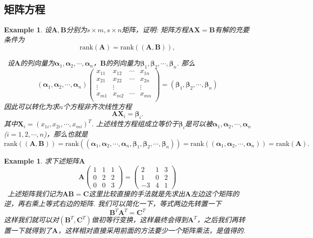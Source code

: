 \documentclass{article}
\newtheorem{example}[theorem]{Example}
\newcommand{\hints}{{\color{blue} \text{hints}}}
\newcommand{\mbf}[1]{\bm{#1}}
\newcommand{\rank}[1]{\text{rank}\left(#1\right)} %
\begin{document}
\subsection{矩阵方程}

\begin{example}
\rm 设$\mbf{A},\mbf{B}$分别为$s \times m,s \times n$矩阵，证明: 矩阵方程$\mbf{A}\mbf{X} = \mbf{B}$有解的充要条件为
$$
\rank{\mbf{A}} = \rank{(\mbf{A},\mbf{B})},
$$

\hints\ 设$\mbf{A}$的列向量为$\mbf{\alpha}_1,\mbf{\alpha}_2,\cdots,\mbf{\alpha}_n$，$\mbf{B}$的列向量为$\mbf{\beta}_1,\mbf{\beta}_2,\cdots,\mbf{\beta}_n$. 那么
$$
(\mbf{\alpha}_1,\mbf{\alpha}_2,\cdots,\mbf{\alpha}_n)\begin{pmatrix}
x_{11} & x_{12} & \cdots & x_{1n} \\
x_{21} & x_{22} & \cdots & x_{2n} \\
\vdots & \vdots &  & \vdots \\
x_{m1} & x_{m2} & \cdots & x_{mn} \\
\end{pmatrix} = (\mbf{\beta}_1,\mbf{\beta}_2,\cdots,\mbf{\beta}_n)
$$
因此可以转化为求$n$个方程非齐次线性方程
$$
\mbf{A} \mbf{X}_i = \mbf{\beta}_i.  
$$
其中$\mbf{X}_i = (x_{1i},x_{2i},\cdots,x_{mi})^T$. 上述线性方程组成立等价于$\mbf{\beta}_{i}$是可以被$\mbf{\alpha}_1,\mbf{\alpha}_2,\cdots,\mbf{\alpha}_n$($i=1,2,\cdots,n$)，那么也就是
$$
\rank{(\mbf{A},\mbf{B})} = \rank{(\mbf{\alpha}_1,\mbf{\alpha}_2,\cdots,\mbf{\alpha}_n,\mbf{\beta}_1,\mbf{\beta}_2,\cdots,\mbf{\beta}_n)} = \rank{(\mbf{\alpha}_1,\mbf{\alpha}_2,\cdots,\mbf{\alpha}_n)} = \rank{\mbf{A}}.
$$
\end{example}

\begin{example}
\rm 求下述矩阵$\mbf{A}$
$$
\mbf{A}\begin{pmatrix}
1 & 1 & 1 \\
0 & 2 & 2 \\
0 & 0 & 3
\end{pmatrix} = 
\begin{pmatrix}
2 & 1 & 3 \\
1 & 0 & 2 \\
-3 & 4 & 1
\end{pmatrix}
$$
\hints\  上述矩阵我们记为$\mbf{AB} = \mbf{C}$这里比较直接的手法就是先求出$\mbf{A}$左边这个矩阵的逆，再右乘上等式右边的矩阵. 我们可以简化一下，等式两边先转置一下
$$
\mbf{B}^T\mbf{A}^T = \mbf{C}^T
$$
这样我们就可以对$(\mbf{B}^{T},\mbf{C}^T)$做初等行变换，这样最终会得到$\mbf{A}^T$，之后我们再转置一下就得到了$\mbf{A}$，这样相对直接采用前面的方法要少一个矩阵乘法，是值得的. 
\end{example}
\end{document}
